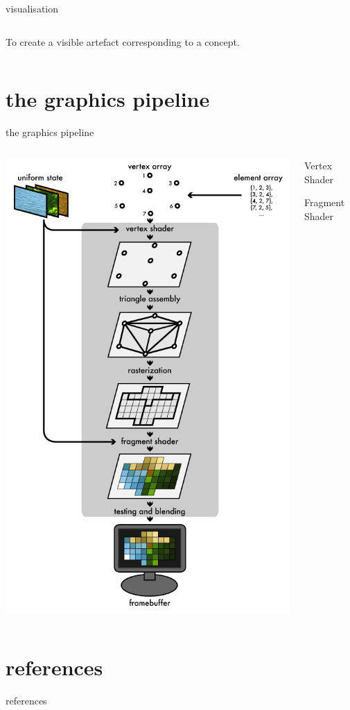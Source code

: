 \documentclass[aspectratio=169,xcolor={dvipsnames,svgnames}]{beamer}
\begin{document}
\begin{frame}[label={sec:orgf126cf1}]{visualisation}
\begin{columns}
\begin{column}{.45\columnwidth}
To create a visible artefact corresponding to a
concept.
\end{column}
\end{columns}
\end{frame}

\section{the graphics pipeline}
\label{sec:org5f47615}

\begin{frame}[label={sec:orgea1d1b6}]{the graphics pipeline}
\begin{columns}
\begin{column}{.3\columnwidth}
\begin{center}
\includegraphics[width=.9\linewidth]{images/gl1-pipeline-01.png}
\end{center}
\end{column}
\begin{column}{.45\columnwidth}
\alert{Vertex Shader}

\alert{Fragment Shader}
\end{column}
\end{columns}
\end{frame}


\section*{references}
\label{sec:orgbf2d919}
\begin{frame}[allowframebreaks]{references}
\printbibliography
\end{frame}
\end{document}
